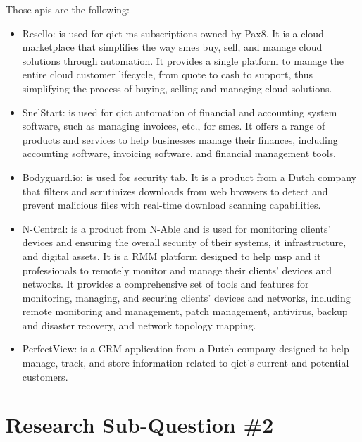 \begin{multicols}{2}
      Those \acrshort{api}s are the following:
      \begin{itemize}
            \item Resello: is used for \acrshort{qict} \acrshort{ms} subscriptions owned by Pax8. It is a cloud
                  marketplace that simplifies the way \acrshort{sme}s buy, sell, and manage cloud solutions through
                  automation. It provides a single platform to manage the entire cloud customer lifecycle, from
                  quote to cash to support, thus simplifying the process of buying, selling and managing cloud
                  solutions.
            \item SnelStart: is used for \acrshort{qict} automation of financial and accounting system software,
                  such as managing invoices, etc., for \acrshort{sme}s. It offers a range of products and services
                  to help businesses manage their finances, including accounting software, invoicing software, and
                  financial management tools.
            \item Bodyguard.io: is used for security tab. It is a product from a Dutch company that filters and
                  scrutinizes downloads from web browsers to detect and prevent malicious files with real-time
                  download scanning capabilities.
            \item N-Central: is a product from N-Able and is used for monitoring clients' devices and ensuring the
                  overall security of their systems, \acrshort{it} infrastructure, and digital assets. It is a
                  \gls{RMM} platform designed to help \acrshort{msp} and \acrshort{it} professionals to
                  remotely monitor and manage their clients' devices and networks. It provides a comprehensive
                  set of tools and features for monitoring, managing, and securing clients' devices and networks,
                  including remote monitoring and management, patch management, antivirus, backup and disaster
                  recovery, and network topology mapping.
            \item PerfectView: is a \gls{CRM} application from a Dutch company designed to help manage, track, and
                  store information related to \acrshort{qict}'s current and potential customers.
      \end{itemize}
      \section{Research Sub-Question \#2}

\end{multicols}
